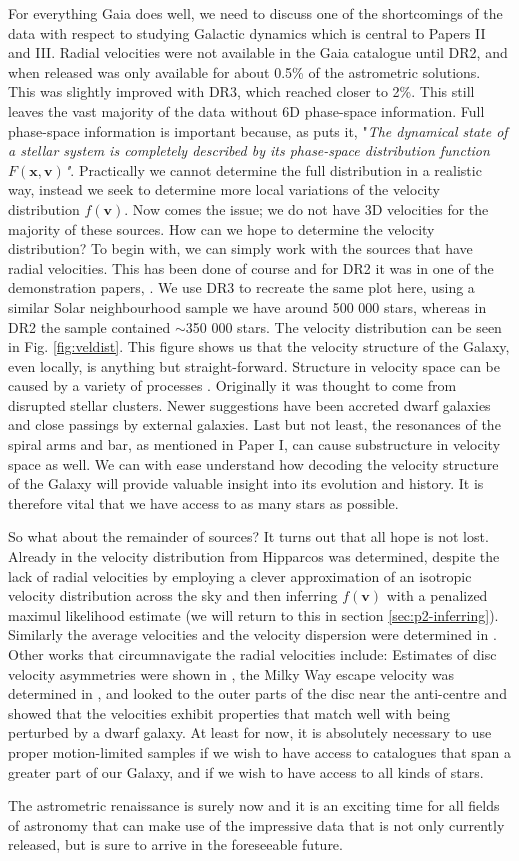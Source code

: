 For everything Gaia does well, we need to discuss one of the shortcomings of the data with respect to studying Galactic dynamics which is central to Papers II and III. Radial velocities were not available in the Gaia catalogue until DR2, and when released was only available for about 0.5\% of the astrometric solutions. This was slightly improved with DR3, which reached closer to 2\%. This still leaves the vast majority of the data without 6D phase-space information. Full phase-space information is important because, as \cite{dehnen:98a} puts it, "\textit{The dynamical state of a stellar system is completely described by its phase-space distribution function $F(\pmb{x}, \pmb{v})$"}. Practically we cannot determine the full distribution in a realistic way, instead we seek to determine more local variations of the velocity distribution $f(\pmb{v})$. Now comes the issue; we do not have 3D velocities for the majority of these sources. How can we hope to determine the velocity distribution? To begin with, we can simply work with the sources that have radial velocities. This has been done of course and for DR2 it was in one of the demonstration papers, \cite{dr2:kinematics}. We use DR3 to recreate the same plot here, using a similar Solar neighbourhood sample we have around 500 000 stars, whereas in DR2 the sample contained {$\sim$}350 000 stars. The velocity distribution can be seen in Fig. \ref{fig:veldist}. This figure shows us that the velocity structure of the Galaxy, even locally, is anything but straight-forward. Structure in velocity space can be caused by a variety of processes \citep{antoja:10a}. Originally it was thought to come from disrupted stellar clusters. Newer suggestions have been accreted dwarf galaxies and close passings by external galaxies. Last but not least, the resonances of the spiral arms and bar, as mentioned in Paper I, can cause substructure in velocity space as well. We can with ease understand how decoding the velocity structure of the Galaxy will provide valuable insight into its evolution and history. It is therefore vital that we have access to as many stars as possible.

So what about the remainder of sources? It turns out that all hope is not lost. Already in \cite{dehnen:98a} the velocity distribution from Hipparcos was determined, despite the lack of radial velocities by employing a clever approximation of an isotropic velocity distribution across the sky and then inferring $f(\pmb{v})$ with a penalized maximul likelihood estimate (we will return to this in section \ref{sec:p2-inferring}). Similarly the average velocities and the velocity dispersion were determined in \cite{dehnen:98b}. Other works that circumnavigate the radial velocities include: Estimates of disc velocity asymmetries were shown in \cite{antoja:17}, the Milky Way escape velocity was determined in \cite{koppelman:21}, and \cite{mcmillan:22} looked to the outer parts of the disc near the anti-centre and showed that the velocities exhibit properties that match well with being perturbed by a dwarf galaxy. At least for now, it is absolutely necessary to use proper motion-limited samples if we wish to have access to catalogues that span a greater part of our Galaxy, and if we wish to have access to all kinds of stars. 

The astrometric renaissance is surely now and it is an exciting time for all fields of astronomy that can make use of the impressive data that is not only currently released, but is sure to arrive in the foreseeable future.
